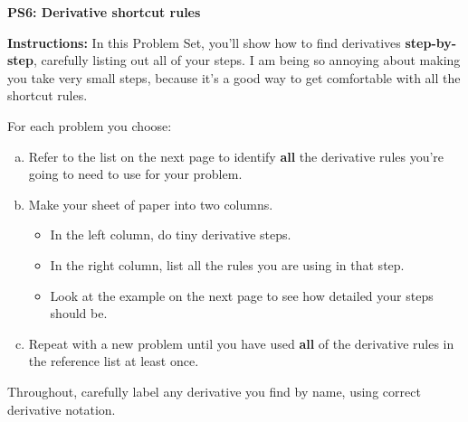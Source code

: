 \documentclass[letter, 12pt]{article}
\renewcommand{\section}[1]{\begin{center} \textbf{#1} \\\end{center}}
\begin{document}
\section{PS6: Derivative shortcut rules}

\textbf{Instructions:} 
In this Problem Set, you'll show how to find derivatives \textbf{step-by-step}, carefully listing out all of your steps. I am being so annoying about making you take very small steps, because it's a good way to get comfortable with all the shortcut rules.

For each problem you choose:
\begin{enumerate}[(a)]
	\item Refer to the list on the next page to identify \textbf{all} the derivative rules you're going to need to use for your problem.
    \item Make your sheet of paper into two columns. 
    \begin{itemize}
        \item In the left column, do tiny derivative steps. 
        \item In the right column, list all the rules you are using in that step.
        \item Look at the example on the next page to see how detailed your steps should be.
    \end{itemize}
	\item Repeat with a new problem until you have used \textbf{all} of the derivative rules in the reference list at least once.
\end{enumerate}
Throughout, carefully label any derivative you find by name, using correct derivative notation.
\vfill
\hrulefill
\end{document}
